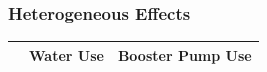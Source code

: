 \documentclass[aspectratio=32]{beamer}
\begin{document}
\begin{frame}
\frametitle{Heterogeneous Effects}

\begin{table}[h!] 
\centering
    \begin{adjustbox}{width=\textwidth, totalheight=\baselineskip,keepaspectratio}
\begin{threeparttable}
\begin{tabular}{@{}l*{1}{CC}@{}}
\toprule
  & Water Use &  Booster Pump Use  \\
\midrule

\bottomrule
\end{tabular}
\begin{tablenotes}
\footnotesize
\item
\end{tablenotes}
\end{threeparttable}
    \end{adjustbox}
\end{table}

\end{frame}
\end{document}
